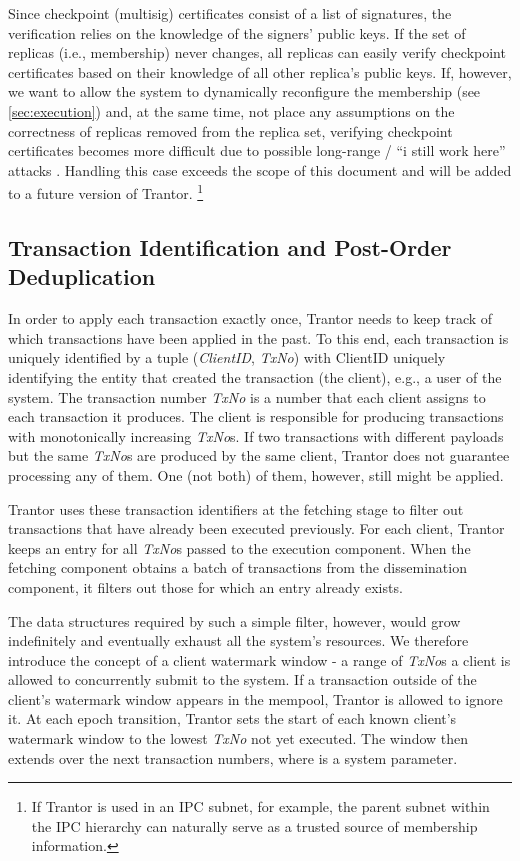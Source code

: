 \documentclass{article}
\begin{document}
Since checkpoint (multisig) certificates consist of a list of signatures, the verification relies on the knowledge of the signers’ public keys.
If the set of replicas (i.e., membership) never changes, all replicas can easily verify checkpoint certificates
based on their knowledge of all other replica’s public keys.
If, however, we want to allow the system to dynamically reconfigure the membership (see \cref{sec:execution})
and, at the same time, not place any assumptions on the correctness of replicas removed from the replica set,
verifying checkpoint certificates becomes more difficult due to possible long-range / ``i still work here'' attacks \cite{longrangeattacks}.
Handling this case exceeds the scope of this document and will be added to a future version of Trantor.%
\footnote{If Trantor is used in an IPC \cite{ipc} subnet, for example, the parent subnet within the IPC hierarchy can naturally serve as a trusted source of membership information.}

\subsection{Transaction Identification and Post-Order Deduplication}
\label{sec:tx-deduplication}

In order to apply each transaction exactly once, Trantor needs to keep track of which transactions have been applied in the past.
To this end, each transaction is uniquely identified by a tuple (\textit{ClientID}, \textit{TxNo})
with ClientID uniquely identifying the entity that created the transaction (the client), e.g., a user of the system.
The transaction number \textit{TxNo} is a number that each client assigns to each transaction it produces.
The client is responsible for producing transactions with monotonically increasing \textit{TxNo}s.
If two transactions with different payloads but the same \textit{TxNo}s are produced by the same client,
Trantor does not guarantee processing any of them.
One (not both) of them, however, still might be applied.

Trantor uses these transaction identifiers at the fetching stage to filter out transactions that have already been executed previously.
For each client, Trantor keeps an entry for all \textit{TxNo}s passed to the execution component.
When the fetching component obtains a batch of transactions from the dissemination component, it filters out those for which an entry already exists.

The data structures required by such a simple filter, however, would grow indefinitely and eventually exhaust all the system’s resources.
We therefore introduce the concept of a client watermark window - a range of \textit{TxNo}s a client is allowed to concurrently submit to the system.
If a transaction outside of the client’s watermark window appears in the mempool, Trantor is allowed to ignore it.
At each epoch transition, Trantor sets the start of each known client’s watermark window to the lowest \textit{TxNo} not yet executed.
The window then extends over the next  transaction numbers, where  is a system parameter.
\end{document}
